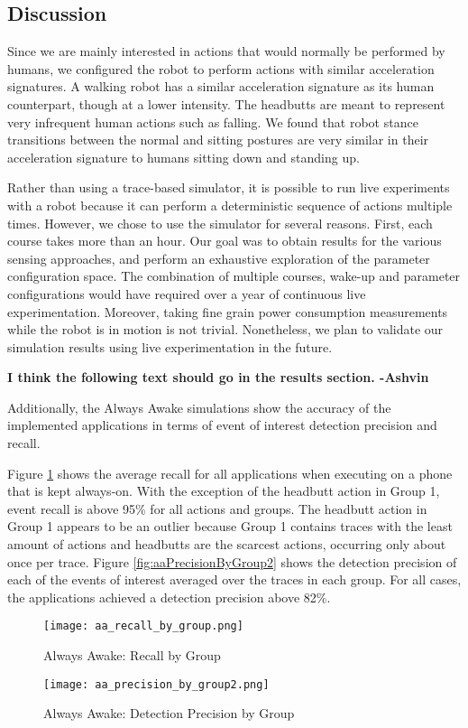 \subsection{Discussion}

Since we are mainly interested in actions that would normally be
performed by humans, we configured the robot to perform actions with
similar acceleration signatures. A walking robot has a similar
acceleration signature as its human counterpart, though at a lower
intensity. The headbutts are meant to represent very infrequent human
actions such as falling. We found that robot stance transitions
between the normal and sitting postures are very similar in their
acceleration signature to humans sitting down and standing up.

Rather than using a trace-based simulator, it is possible to run live
experiments with a robot because it can perform a deterministic
sequence of actions multiple times. However, we chose to use the
simulator for several reasons. First, each course takes more than an
hour. Our goal was to obtain results for the various sensing
approaches, and perform an exhaustive exploration of the parameter
configuration space. The combination of multiple courses, wake-up and
parameter configurations would have required over a year of continuous
live experimentation. Moreover, taking fine grain power consumption
measurements while the robot is in motion is not trivial.
Nonetheless, we plan to validate our simulation results using live
experimentation in the future.

\textbf{I think the following text should go in the results section. -Ashvin}

Additionally, the Always Awake simulations show
the accuracy of the implemented applications in terms of event of
interest detection precision and recall. 


Figure \ref{fig:aaRecallByGroup} shows the average recall for all
applications when executing on a phone that is kept always-on.  With
the exception of the headbutt action in Group 1, event recall is above
95\% for all actions and groups. The headbutt action in Group 1
appears to be an outlier because Group 1 contains traces with the
least amount of actions and headbutts are the scarcest actions,
occurring only about once per trace. Figure
\ref{fig:aaPrecisionByGroup2} shows the detection precision of each of
the events of interest averaged over the traces in each group. For all
cases, the applications achieved a detection precision above 82\%.



\begin{figure}[t]
	\texttt{[image: aa\_recall\_by\_group.png]}
	\caption{Always Awake: Recall by Group}
    	\label{fig:aaRecallByGroup}
\end{figure}


\begin{figure}[t]
	\texttt{[image: aa\_precision\_by\_group2.png]}
	\caption{Always Awake: Detection Precision by Group}
    	\label{fig:aaPrecisionByGroup}
\end{figure}


